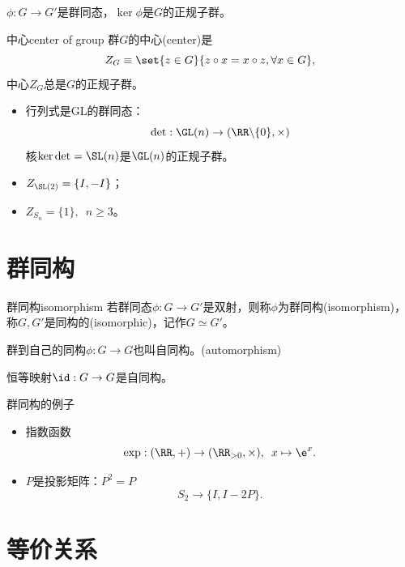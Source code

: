 \begin{theorem}{}{}
	$\phi:G\to G'$是群同态，$\ker\phi$是$G$的正规子群。
\end{theorem}
\begin{definition}{中心}{center of group}
	群$G$的中心(center)是
	\begin{equation}
		Z_G\equiv\set{z\in G}{z\circ x=x\circ z,\forall x\in G},
	\end{equation}
	中心$Z_G$总是$G$的正规子群。
\end{definition}
\begin{example}{}{}
	\begin{itemize}
		\item 行列式是GL的群同态：
		\[
			\det:\GL(n)\to(\RR\backslash\{0\},\times)
		\]
		核$\ker\det=\SL(n)$是$\GL(n)$的正规子群。
		\item $Z_{\SL(2)}=\{I,-I\}$；
		\item $Z_{S_n}=\{1\},\enspace n\geq 3$。
	\end{itemize}
\end{example}

\section{群同构}

\begin{definition}{群同构}{isomorphism}
	若群同态$\phi:G\to G'$是双射，则称$\phi$为群同构(isomorphism)，称$G,G'$是同构的(isomorphic)，记作$G\simeq G'$。
	
	群到自己的同构$\phi:G\to G$也叫自同构。(automorphism)
\end{definition}
恒等映射$\id:G\to G$是自同构。
\begin{example}{群同构的例子}{}
	\begin{itemize}
		\item 指数函数
		\[
			\exp:(\RR,+)\to(\RR_{>0},\times),\enspace x\mapsto\e^x.
		\]
		\item $P$是投影矩阵：$P^2=P$
		\[
			S_2\to\{I,I-2P\}.
		\]
	\end{itemize}
\end{example}

\section{等价关系}

